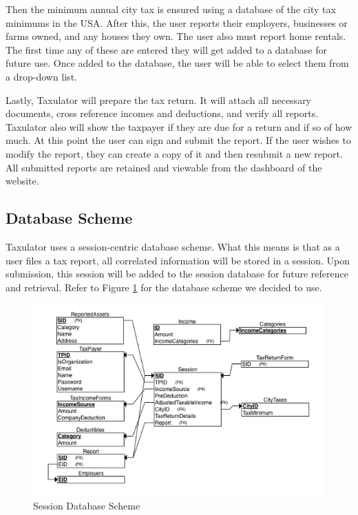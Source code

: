 \documentclass[sigconf]{acmart}
\begin{document}
Then the minimum annual city tax is ensured using a database of the city tax minimums in the USA. After this, the user reports their employers, businesses or farms owned, and any houses they own. The user also must report home rentals. The first time any of these are entered they will get added to a database for future use. Once added to the database, the user will be able to select them from a drop-down list.

Lastly, Taxulator will prepare the tax return. It will attach all necessary documents, cross reference incomes and deductions, and verify all reports. Taxulator also will show the taxpayer if they are due for a return and if so of how much. At this point the user can sign and submit the report.
If the user wishes to modify the report, they can create a copy of it and then resubmit a new report. All submitted reports are retained and viewable from the dashboard of the website.

\subsection{Database Scheme}
Taxulator uses a session-centric database scheme. What this means is that as a user files a tax report, all correlated information will be stored in a session. Upon submission, this session will be added to the session database for future reference and retrieval. Refer to Figure \ref{DBSchema} for the database scheme we decided to use.

\begin{figure}[H]
  \centering
  \includegraphics[width=\linewidth]{Images/DBSchema.png}
  \caption{Session Database Scheme}
  \label{DBSchema}
\end{figure}
\end{document}
